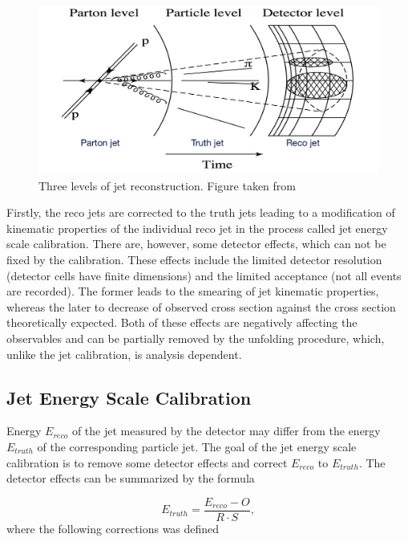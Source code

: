 \begin{figure}[t]
  \centering
  \includegraphics[width=\textwidth]{Chapter2/JetPhases.png}
  \caption[Three levels of jet reconstruction.]
    {Three levels of jet reconstruction. Figure taken from \cite{ZdenekThesis} } 
  \label{fig:JetPhases}
\end{figure}

Firstly, the reco jets are corrected to the truth jets leading to a modification
of kinematic properties of the individual reco jet in the process called jet energy
scale calibration.
There are, however, some detector effects, which can not be
fixed by the calibration. These effects include the limited detector resolution
(detector cells have finite dimensions) and the limited acceptance (not all
events are recorded). The former leads to the smearing of jet kinematic
properties, whereas the later to decrease of observed cross section against the
cross section theoretically expected. Both of these effects are negatively affecting the
observables and can be partially removed by the unfolding procedure, which,
unlike the jet calibration, is analysis dependent.

\subsection{Jet Energy Scale Calibration}

Energy $E_{reco}$ of the jet measured by the detector may differ from the energy
$E_{truth}$ of the corresponding particle jet. The goal of the jet energy scale
calibration is to remove some detector effects and correct $E_{reco}$ to
$E_{truth}$. The detector effects can be summarized by the formula

\begin{equation}
  E_{truth} = \frac{E_{reco} - O}{R \cdot S},
\end{equation}
where the following corrections was defined

